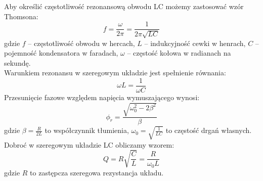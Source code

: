 \documentclass{article}
\begin{document}
Aby określić częstotliwość rezonansową obwodu LC możemy zastosować wzór Thomsona:
$$f= \frac{\omega}{2\pi} = \frac{1}{2\pi \sqrt{LC}}$$
gdzie $f$ – częstotliwość obwodu w hercach, $L$ – indukcyjność cewki w henrach, $C$ – pojemność kondensatora w faradach, $\omega$ – częstość kołowa w radianach na sekundę. \\
Warunkiem rezonansu w szeregowym  układzie jest spełnienie równania:
$$\omega L  = \frac{1}{\omega C}$$
Przesunięcie fazowe względem napięcia wymuszającego wynosi:
$$\phi_r = \frac{\sqrt{\omega_0^2 - 2\beta^2}}{\beta}$$
gdzie $\beta = \frac{R}{2L}$ to współczynnik tłumienia, $\omega_0 = \sqrt{\frac{1}{LC}}$ to częstość drgań własnych.\\
Dobroć w szeregowym układzie LC obliczamy wzorem:
$$ Q = R\sqrt{\frac{C}{L}} = \frac{R}{\omega_0 L}$$
gdzie $R$ to zastępcza szeregowa rezystancja układu.
\end{document}
